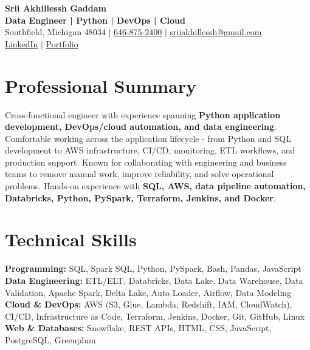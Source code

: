 \documentclass[letterpaper,10pt]{article}
\begin{document}
\fontsize{9.35pt}{10.45pt}\selectfont

\begin{center}
    {\LARGE \textbf{Srii Akhillessh Gaddam}} \\[-1pt]
    \textbf{Data Engineer | Python | DevOps | Cloud} \\[2pt]
    Southfield, Michigan 48034 $|$
    \href{tel:6468752400}{646-875-2400} $|$
    \href{mailto:sriiakhillessh@gmail.com}{sriiakhillessh@gmail.com} \\[1pt]
    \href{https://www.linkedin.com/in/srii-akhiilessh-gaddam-b48668191/}{LinkedIn} $|$
    \href{https://sriiakhillesshg.github.io/portfolio/}{Portfolio}
\end{center}
\vspace{-8pt}

\section{Professional Summary}
\small{Cross-functional engineer with experience spanning \textbf{Python application development, DevOps/cloud automation, and data engineering}. Comfortable working across the application lifecycle - from Python and SQL development to AWS infrastructure, CI/CD, monitoring, ETL workflows, and production support. Known for collaborating with engineering and business teams to remove manual work, improve reliability, and solve operational problems. Hands-on experience with \textbf{SQL, AWS, data pipeline automation, Databricks, Python, PySpark, Terraform, Jenkins, and Docker}.}

\section{Technical Skills}
\small{
\textbf{Programming:} SQL, Spark SQL, Python, PySpark, Bash, Pandas, JavaScript \\
\textbf{Data Engineering:} ETL/ELT, Databricks, Data Lake, Data Warehouse, Data Validation, Apache Spark, Delta Lake, Auto Loader, Airflow, Data Modeling \\
\textbf{Cloud \& DevOps:} AWS (S3, Glue, Lambda, Redshift, IAM, CloudWatch), CI/CD, Infrastructure as Code, Terraform, Jenkins, Docker, Git, GitHub, Linux \\
\textbf{Web \& Databases:} Snowflake, REST APIs, HTML, CSS, JavaScript, PostgreSQL, Greenplum
}
\end{document}
